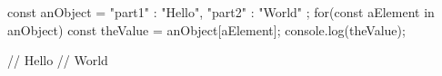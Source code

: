 const anObject = {
    "part1" : "Hello",
    "part2" : "World"
};
for(const aElement in anObject){
    const theValue = anObject[aElement];
    console.log(theValue);
}

// Hello
// World